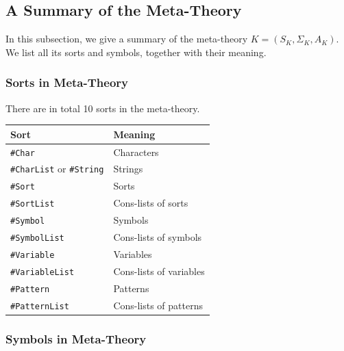 \documentclass[UTF8,11pt]{article}
\theoremstyle{plain}
\theoremstyle{definition}
\theoremstyle{remark}
\newcommand{\sharpsymbol}{\#}
\newcommand{\KChar}{\texttt{\sharpsymbol Char}}
\newcommand{\KCharList}{\texttt{\sharpsymbol CharList}}
\newcommand{\KString}{\texttt{\sharpsymbol String}}
\newcommand{\KSort}{\texttt{\sharpsymbol Sort}}
\newcommand{\KSymbol}{\texttt{\sharpsymbol Symbol}}
\newcommand{\KPatternList}{\texttt{\sharpsymbol PatternList}}
\newcommand{\KSortList}{\texttt{\sharpsymbol SortList}}
\newcommand{\KSymbolList}{\texttt{\sharpsymbol SymbolList}}
\newcommand{\KVariableList}{\texttt{\sharpsymbol VariableList}\xspace}
\newcommand{\KVariable}{\texttt{\sharpsymbol Variable}}
\newcommand{\KPattern}{\texttt{\sharpsymbol Pattern}}
\begin{document}
\subsection{A Summary of the Meta-Theory}
\label{sec:K-summary}
In this subsection, we give a summary of the meta-theory $K = (S_K, \Sigma_K, 
A_K)$.
We list all its sorts and symbols, together with their meaning.

\subsubsection{Sorts in Meta-Theory}
There are in total 10 sorts in the meta-theory.
\begin{center}
	\begin{tabular}{l|l}
		\textbf{Sort} & \textbf{Meaning} \\
		\hline
		\KChar & Characters \\
		{\KCharList} or \KString & Strings \\
		\KSort & Sorts \\
		\KSortList & Cons-lists of sorts \\
		\KSymbol & Symbols \\
		\KSymbolList & Cons-lists of symbols \\
		\KVariable & Variables \\
		\KVariableList & Cons-lists of variables \\
		\KPattern & Patterns \\
		\KPatternList & Cons-lists of patterns \\
	\end{tabular}
\end{center}

\subsubsection{Symbols in Meta-Theory}
\end{document}

